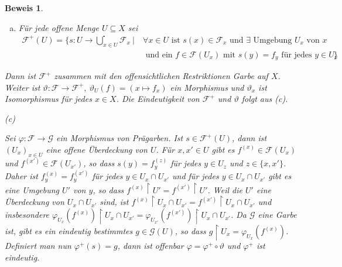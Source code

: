 \documentclass[a4paper,oneside]{scrbook}
\theoremstyle{break}
\theoremstyle{nonumberbreak}
\theoremstyle{nonumberplain}
\newtheorem{Bew}{Beweis}
\theoremstyle{break}
\renewcommand{\phi}{%
	\ensuremath{\varphi}%
}
\renewcommand{\theta}{%
	\ensuremath{\vartheta}%
}
\newcommand{\todo}[1]{%
	\marginpar{ {\Large \textbf{TODO}}\\#1}%
}
\begin{document}
\begin{Bew}
\begin{enumerate}[(a)]
	\item
	Für jede offene Menge $U \subseteq X$ sei
	\begin{align*}
	 \mathcal{F}^+(U) = \bigg\{ s\colon U \to \bigcup^{\centerdot}_{x \in U} \mathcal{F}_x\ \Big|\
			&\forall x \in U \text{ ist }  s(x) \in \mathcal{F}_x \text{ und } \exists \text{ Umgebung } U_x \text{ von } x\\
			&\text{ und ein } f \in \mathcal{F}(U_x) \text{ mit } s(y) = f_y \text{ für jedes } y \in U_x 
			& \bigg\}
	\end{align*}
	\end{enumerate}
	Dann ist $\mathcal{F}^+$ zusammen mit den offensichtlichen Restriktionen Garbe auf $X$.
	Weiter ist $\theta: \mathcal{F} \to \mathcal{F}^+,\ \theta_U(f) = ( x \mapsto f_x )$ ein Morphismus und $\theta_x$ ist Isomorphismus für
	jedes $x \in X$. Die Eindeutigkeit von $\mathcal{F}^+$ und $\theta$ folgt aus (c).
	\item[(c)]\todo{Beweis klarer machen!}
	Sei $\phi\colon \mathcal{F} \to \mathcal{G}$ ein Morphismus von Prägarben.
	Ist $s \in \mathcal{F}^+(U)$, dann ist $(U_x)_{x \in U}$ eine offene Überdeckung von $U$.
	Für $x,x' \in U$ gibt es $f^{(x)} \in \mathcal{F}(U_x)$ und $f^{(x')} \in \mathcal{F}(U_{x'})$, so dass 
	$s(y) = f^{(z)}_{y}$ für jedes $y \in U_z$ und $z \in \{x,x'\}$.
	Daher ist $f^{(x)}_{y} = f^{(x')}_{y}$ für jedes $y \in U_{x} \cap U_{x'}$ und für jedes $y \in U_{x}\cap U_{x'}$ gibt es eine Umgebung $U'$ von $y$, so dass
	$f^{(x)} \restriction U' = f^{(x')}\restriction U'$.
	Weil die $U'$ eine Überdeckung von $U_{x}\cap U_{x'}$ sind, ist $f^{(x)} \restriction U_{x} \cap U_{x'} = f^{(x')} \restriction U_{x} \cap U_{x'}$ und insbesondere
	$\phi_{U_x}( f^{(x)} )\restriction U_{x}\cap U_{x'} = \phi_{U_{x'}}( f^{(x')} ) \restriction U_{x} \cap U_{x'}$.
	Da $\mathcal{G}$ eine Garbe ist, gibt es ein eindeutig bestimmtes $g \in \mathcal{G}(U)$, so dass $g \restriction U_x = \phi_{U_x}( f^{(x)} )$.
	Definiert man nun $\phi^+(s) = g$, dann ist offenbar $\phi = \phi^+ \circ \theta$ und $\phi^+$ ist eindeutig.
\end{Bew}
\end{document}

